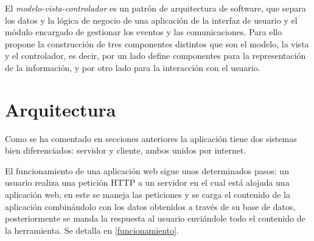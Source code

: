 El \emph{modelo-vista-controlador} es un patrón de arquitectura de software, que separa los datos y la lógica de negocio de una aplicación de la interfaz de usuario y el módulo encargado de gestionar los eventos y las comunicaciones. Para ello propone la construcción de tres componentes distintos que son el modelo, la vista y el controlador, es decir, por un lado define componentes para la representación de la información, y por otro lado para la interacción con el usuario.





\section{Arquitectura}\label{arquitectura}

Como se ha comentado en secciones anteriores la aplicación tiene dos sistemas bien diferenciados: servidor y cliente, ambos unidos por internet. 


El funcionamiento de una aplicación web sigue unos determinados pasos: un usuario realiza una petición HTTP a un servidor en el cual está alojada una aplicación web, en este se maneja las peticiones y se carga el contenido de la aplicación combinándolo con los datos obtenidos a través de su base de datos, posteriormente se manda la respuesta al usuario enviándole todo el contenido de la herramienta. Se detalla en \ref{funcionamiento}.

\label{funcionamiento}
